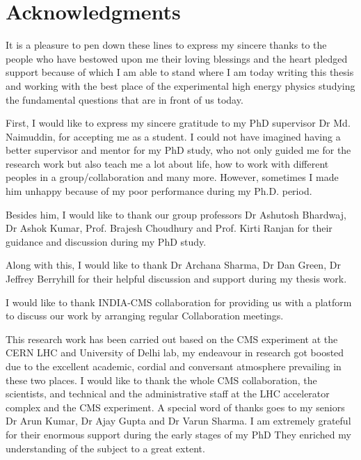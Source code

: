
\chapter*{Acknowledgments}
It is a pleasure to pen down these lines to express my sincere thanks to the people who have bestowed upon me their loving blessings and the heart pledged support because of which I am able to stand where I am today writing this thesis and working with the   best place of the experimental high energy physics studying the fundamental questions that are in front of us today.

First, I would like to express my sincere gratitude to my PhD supervisor Dr Md. Naimuddin, for accepting me as a student. I could not have imagined having a better supervisor and mentor for my PhD study, who not only guided me for the research work but also teach me a lot about life, how to work with different peoples in a group/collaboration and many more. However, sometimes I made him unhappy because of my poor performance during my Ph.D. period.

Besides him, I would like to thank our group professors Dr Ashutosh Bhardwaj, Dr Ashok Kumar, Prof. Brajesh Choudhury and Prof. Kirti Ranjan for their guidance and discussion during my PhD study.

Along with this, I would like to thank Dr Archana Sharma, Dr Dan Green, Dr Jeffrey Berryhill for their helpful discussion and support during my thesis work.

I would like to thank INDIA-CMS collaboration for providing us with a platform to discuss our work by arranging regular Collaboration meetings. 

This research work has been carried out based on the CMS experiment at the CERN LHC and University of Delhi lab, my endeavour in research got boosted due to the excellent academic, cordial and conversant atmosphere prevailing in these two places. I would like to thank the whole CMS collaboration, the scientists, and technical and the administrative staff at the LHC accelerator complex and the CMS experiment. A special word of thanks goes to my seniors Dr Arun Kumar, Dr Ajay Gupta and Dr Varun Sharma. I am extremely grateful for their enormous support during the early stages of my PhD They enriched my understanding of the subject to a great extent.

